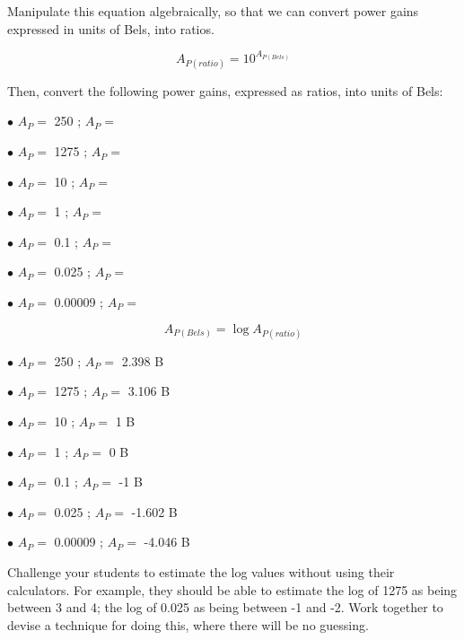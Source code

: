 

Manipulate this equation algebraically, so that we can convert power gains expressed in units of Bels, into ratios.

$$A_{P(ratio)} = 10^{A_{P(Bels)}}$$

Then, convert the following power gains, expressed as ratios, into units of Bels:

\medskip
\item{$\bullet$} $A_P =$ 250 ; $A_P =$
\vskip 5pt
\item{$\bullet$} $A_P =$ 1275 ; $A_P =$
\vskip 5pt
\item{$\bullet$} $A_P =$ 10 ; $A_P =$
\vskip 5pt
\item{$\bullet$} $A_P =$ 1 ; $A_P =$
\vskip 5pt
\item{$\bullet$} $A_P =$ 0.1 ; $A_P =$
\vskip 5pt
\item{$\bullet$} $A_P =$ 0.025 ; $A_P =$
\vskip 5pt
\item{$\bullet$} $A_P =$ 0.00009 ; $A_P =$
\medskip







$$A_{P(Bels)} = \log A_{P(ratio)}$$

\vskip 10pt

\medskip
\item{$\bullet$} $A_P =$ 250 ; $A_P =$ 2.398 B
\vskip 5pt
\item{$\bullet$} $A_P =$ 1275 ; $A_P =$ 3.106 B
\vskip 5pt
\item{$\bullet$} $A_P =$ 10 ; $A_P =$ 1 B
\vskip 5pt
\item{$\bullet$} $A_P =$ 1 ; $A_P =$ 0 B
\vskip 5pt
\item{$\bullet$} $A_P =$ 0.1 ; $A_P =$ -1 B
\vskip 5pt
\item{$\bullet$} $A_P =$ 0.025 ; $A_P =$ -1.602 B
\vskip 5pt
\item{$\bullet$} $A_P =$ 0.00009 ; $A_P =$ -4.046 B
\medskip







Challenge your students to estimate the log values without using their calculators.  For example, they should be able to estimate the log of 1275 as being between 3 and 4; the log of 0.025 as being between -1 and -2.  Work together to devise a technique for doing this, where there will be no guessing.

